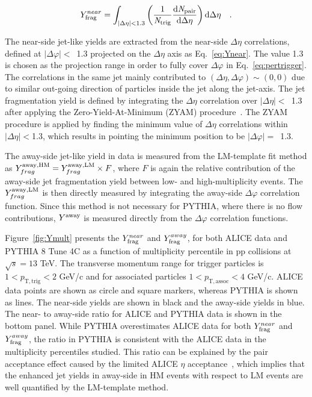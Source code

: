 \begin{eqnarray}
Y^{near}_{\rm{frag}} = \int_{|\Delta \eta|<1.3} \left( \frac{1}{\it{N}_{\rm{trig}}} \frac{ \rm{d}\it{}N_{\rm{pair}} }{ \rm{d}\Delta\eta } \right) \rm{d} \Delta\eta \quad.
\label{eq:Ynear}
\end{eqnarray}
  
The near-side jet-like yields are extracted from the near-side $\Delta\eta$ correlations, defined at $|\Delta\varphi|<$~1.3 projected on the $\Delta\eta$ axis as Eq.~\ref{eq:Ynear}. The value 1.3 is chosen as the projection range in order to fully cover $\Delta\varphi$ in Eq.~\ref{eq:pertrigger}.
The correlations in the same jet mainly contributed to $(\Delta\eta, \Delta\varphi) \sim (0,0)$ due to similar out-going direction of particles inside the jet along the jet-axis. The jet fragmentation yield is defined by integrating the $\Delta\eta$ correlation over $|\Delta\eta|<$~1.3 after applying the Zero-Yield-At-Minimum (ZYAM) procedure~\cite{Ajitanand:2005jj}. The ZYAM procedure is applied by finding the minimum value of $\Delta\eta$ correlations within $|\Delta\eta|<$1.3, which results in pointing the minimum position to be $|\Delta\varphi|=$~1.3.

The away-side jet-like yield in data is measured from the LM-template fit method as $Y^{\rm{away, HM}}_{frag} = Y^{\rm{away, LM}}_{frag} \times F$, where $F$ is again the relative contribution of the away-side jet fragmentation yield between low- and high-multiplicity events. The $Y^{\rm{away, LM}}_{frag}$ is then directly measured by integrating the away-side $\Delta\varphi$ correlation function. Since this method is not necessary for PYTHIA, where there is no flow contributions, $Y^{\rm{away}}$ is measured directly from the $\Delta\varphi$ correlation functions.

Figure~\ref{fig:Ymult} presents the $Y^{near}_{\rm{frag}}$ and $Y^{away}_{\rm{frag}}$, for both ALICE data and PYTHIA 8 Tune 4C as a function of multiplicity percentile in pp collisions at $\sqrt{s}=13$ TeV. The transverse momentum range for trigger particles is $1<p_\mathrm{T,trig}<2$ GeV/c and for associated particles $1<p_\mathrm{T,assoc}<4$ GeV/c. ALICE data points are shown as circle and square markers, whereas PYTHIA is shown as lines. The near-side yields are shown in black and the away-side yields in blue.
The near- to away-side ratio for ALICE and PYTHIA data is shown in the bottom panel. While PYTHIA overestimates ALICE data for both $Y^{near}_{\rm{frag}}$ and $Y^{away}_{\rm{frag}}$, the ratio in PYTHIA is consistent with the ALICE data in the multiplicity percentiles studied. This ratio can be explained by the pair acceptance effect caused by the limited ALICE $\eta$ acceptance~\cite{PHENIX:2006gto}, which implies that the enhanced jet yields in away-side in HM events with respect to LM events are well quantified by the LM-template method.

